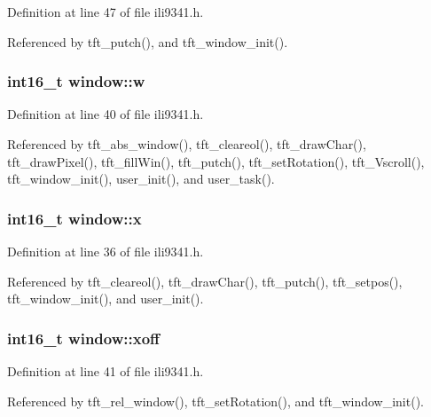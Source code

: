 Definition at line 47 of file ili9341.\-h.



Referenced by tft\-\_\-putch(), and tft\-\_\-window\-\_\-init().

\hypertarget{structwindow_ad89fdeb11ce94e2e7501f7290372d6ae}{
\subsubsection[{w}]{\setlength{\rightskip}{0pt plus 5cm}int16\-\_\-t window\-::w}}\label{structwindow_ad89fdeb11ce94e2e7501f7290372d6ae}


Definition at line 40 of file ili9341.\-h.



Referenced by tft\-\_\-abs\-\_\-window(), tft\-\_\-cleareol(), tft\-\_\-draw\-Char(), tft\-\_\-draw\-Pixel(), tft\-\_\-fill\-Win(), tft\-\_\-putch(), tft\-\_\-set\-Rotation(), tft\-\_\-\-Vscroll(), tft\-\_\-window\-\_\-init(), user\-\_\-init(), and user\-\_\-task().

\hypertarget{structwindow_a879b99940dfc34772f0257f54c67b817}{
\subsubsection[{x}]{\setlength{\rightskip}{0pt plus 5cm}int16\-\_\-t window\-::x}}\label{structwindow_a879b99940dfc34772f0257f54c67b817}


Definition at line 36 of file ili9341.\-h.



Referenced by tft\-\_\-cleareol(), tft\-\_\-draw\-Char(), tft\-\_\-putch(), tft\-\_\-setpos(), tft\-\_\-window\-\_\-init(), and user\-\_\-init().

\hypertarget{structwindow_a12d0408f393bc8d23cc3f1ce46c39879}{
\subsubsection[{xoff}]{\setlength{\rightskip}{0pt plus 5cm}int16\-\_\-t window\-::xoff}}\label{structwindow_a12d0408f393bc8d23cc3f1ce46c39879}


Definition at line 41 of file ili9341.\-h.



Referenced by tft\-\_\-rel\-\_\-window(), tft\-\_\-set\-Rotation(), and tft\-\_\-window\-\_\-init().

